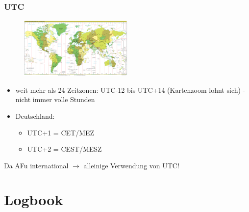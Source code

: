 \begin{frame}
  \frametitle{UTC}

  \begin{center}
    \begin{figure}
      \includegraphics[width=0.5\textwidth,height=.35\textheight,keepaspectratio]{bv13/Standard_time_zones_of_the_world.png}
    \end{figure}
  \end{center}

  \begin{itemize}
    \item weit mehr als 24 Zeitzonen: UTC-12 bis UTC+14 (Kartenzoom lohnt sich)
      - nicht immer volle Stunden
    \item Deutschland:
      \begin{itemize}
        \item UTC+1 = CET/MEZ
        \item UTC+2 = CEST/MESZ
      \end{itemize}
  \end{itemize}

  Da AFu international $\rightarrow$ alleinige Verwendung von UTC!


\end{frame}

\section{Logbook}

